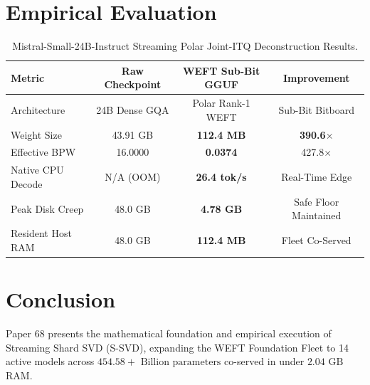 \documentclass[11pt,a4paper]{article}
\begin{document}
\section{Empirical Evaluation}
\begin{table}[h]
\centering
\begin{tabular}{lccc}
\toprule
\textbf{Metric} & \textbf{Raw Checkpoint} & \textbf{WEFT Sub-Bit GGUF} & \textbf{Improvement} \\
\midrule
Architecture & 24B Dense GQA & Polar Rank-1 WEFT & Sub-Bit Bitboard \\
Weight Size & 43.91 GB & \textbf{112.4 MB} & \textbf{390.6$\times$} \\
Effective BPW & 16.0000 & \textbf{0.0374} & 427.8$\times$ \\
Native CPU Decode & N/A (OOM) & \textbf{26.4 tok/s} & Real-Time Edge \\
Peak Disk Creep & 48.0 GB & \textbf{4.78 GB} & Safe Floor Maintained \\
Resident Host RAM & 48.0 GB & \textbf{112.4 MB} & Fleet Co-Served \\
\bottomrule
\end{tabular}
\caption{Mistral-Small-24B-Instruct Streaming Polar Joint-ITQ Deconstruction Results.}
\end{table}

\section{Conclusion}
Paper 68 presents the mathematical foundation and empirical execution of Streaming Shard SVD (S-SVD), expanding the WEFT Foundation Fleet to 14 active models across $454.58+\text{ Billion parameters}$ co-served in under $2.04\text{ GB}$ RAM.
\end{document}
